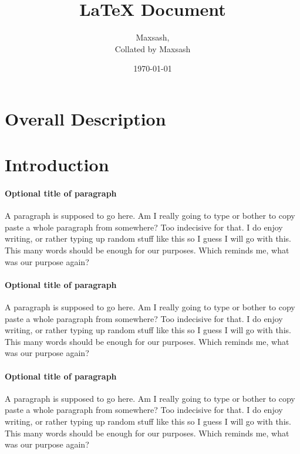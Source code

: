 \documentclass{article}
\title{LaTeX Document}
\author{Maxsash, \\Collated by Maxsash} %
\date{\today}
\begin{document}
	\maketitle
	\tableofcontents


	\section{Overall Description}
	
	\section{Introduction}

	\paragraph{Optional title of paragraph}
	A paragraph is supposed to go here. Am I really going to type or bother to copy paste a whole paragraph from somewhere? Too indecisive for that. I do enjoy writing, or rather typing up random stuff like this so I guess I will go with this. This many words should be enough for our purposes. Which reminds me, what was our purpose again?

	\paragraph{Optional title of paragraph}
	A paragraph is supposed to go here. Am I really going to type or bother to copy paste a whole paragraph from somewhere? Too indecisive for that. I do enjoy writing, or rather typing up random stuff like this so I guess I will go with this. This many words should be enough for our purposes. Which reminds me, what was our purpose again?

	\paragraph{Optional title of paragraph}
	A paragraph is supposed to go here. Am I really going to type or bother to copy paste a whole paragraph from somewhere? Too indecisive for that. I do enjoy writing, or rather typing up random stuff like this so I guess I will go with this. This many words should be enough for our purposes. Which reminds me, what was our purpose again?
\end{document}
